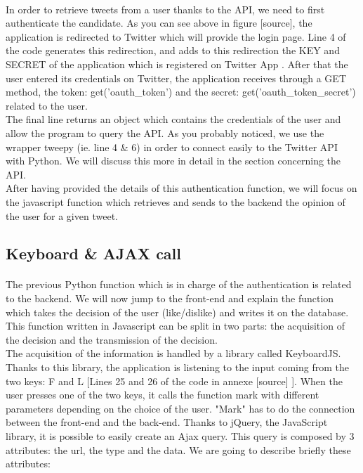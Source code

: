 \paragraph{}
In order to retrieve tweets from a user thanks to the API, we need to first authenticate the candidate. As you can see above in figure [source], the application is redirected to Twitter which will provide the login page. Line 4 of the code generates this redirection, and adds to this redirection the KEY and SECRET of the application which is registered on Twitter App \cite{t_dev_auth}. After that the user entered its credentials on Twitter, the application receives through a GET method, the token: get('oauth\_token') and the secret: get('oauth\_token\_secret') related to the user. \\
The final line returns an object which contains the credentials of the user and allow the program to query the API. As you probably noticed, we use the wrapper tweepy (ie. line 4 \& 6) in order to connect easily to the Twitter API with Python. We will discuss this more in detail in the section concerning the API. \\
After having provided the details of this authentication function, we will focus on the javascript function which retrieves and sends to the backend the opinion of the user for a given tweet.

 

\subsection{Keyboard \& AJAX call}

\paragraph{}
The previous Python function which is in charge of the authentication is related to the backend. We will now jump to the front-end and explain the function which takes the decision of the user (like/dislike) and writes it on the database. This function written in Javascript can be split in two parts: the acquisition of the decision and the transmission of the decision.  \\
The acquisition of the information is handled by a library called KeyboardJS. Thanks to this library, the application is listening to the input coming from the two keys: F and L [Lines 25 and 26 of the code in annexe [source] ]. When the user presses one of the two keys, it calls the function mark with different parameters depending on the choice of the user. "Mark" has to do the connection between the front-end and the back-end. Thanks to jQuery, the JavaScript library, it is possible to easily create an Ajax query. This query is composed by 3 attributes: the url, the type and the data. We are going to describe briefly these attributes:

